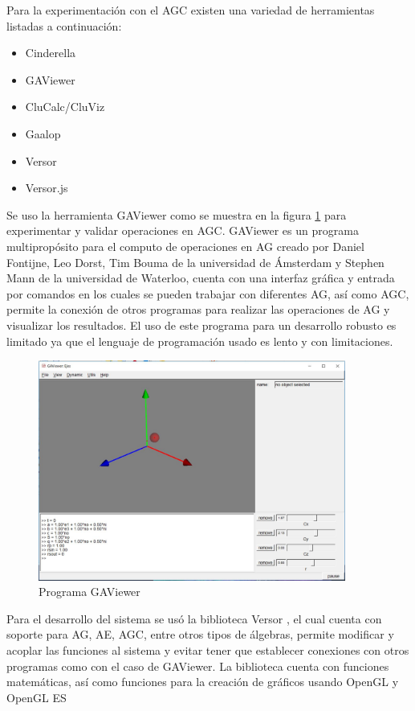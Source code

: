 	Para la experimentación con el AGC existen una variedad de herramientas listadas a continuación:
	\begin{itemize}
		\item Cinderella \cite{Cinderel45:online}
		\item GAViewer \cite{Geometri75:online}
		\item CluCalc/CluViz \cite{CLUCalc12:online}
		\item Gaalop \cite{GaalopGe19:online}
		\item Versor \cite{versor}
		\item Versor.js \cite{versorJswe94:online}
	\end{itemize}
	
	Se uso la herramienta GAViewer como se muestra en la figura \ref{fig:GAViwer} para experimentar y validar operaciones en AGC. GAViewer es un programa multipropósito para el computo de operaciones en AG creado por Daniel Fontijne, Leo Dorst, Tim Bouma de la universidad de Ámsterdam y Stephen Mann de la universidad de Waterloo, cuenta con una interfaz gráfica y entrada por comandos en los cuales se pueden trabajar con diferentes AG, así como AGC, permite la conexión de otros programas para realizar las operaciones de AG y visualizar los resultados. El uso de este programa para un desarrollo robusto es limitado ya que el lenguaje de programación usado es lento y con limitaciones\cite{Geometri75:online}.\\
	
	\begin{figure}[!htb]
		\centering
		\includegraphics[width=0.9\textwidth]{02Desarrollo/AGC/imagenes/GAViewer.JPG}
		\caption{Programa GAViewer}%
		\label{fig:GAViwer}
	\end{figure}
	

	Para el desarrollo del sistema se usó la biblioteca Versor \cite{versor}, el cual cuenta con soporte para AG, AE, AGC, entre otros tipos de álgebras, permite modificar y acoplar las funciones al sistema y evitar tener que establecer conexiones con otros programas como con el caso de GAViewer. La biblioteca cuenta con funciones matemáticas, así como funciones para la creación de gráficos usando OpenGL y OpenGL ES\\
	
